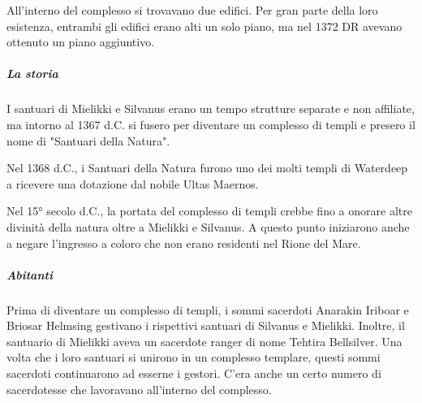 \documentclass{article}
\begin{document}
                All'interno del complesso si trovavano due edifici. Per gran parte della loro esistenza, entrambi gli edifici erano alti un solo piano, ma nel 1372 DR avevano ottenuto un piano aggiuntivo.

                \subparagraph{La storia}
                I santuari di Mielikki e Silvanus erano un tempo strutture separate e non affiliate, ma intorno al 1367 d.C. si fusero per diventare un complesso di templi e presero il nome di "Santuari della Natura".

                Nel 1368 d.C., i Santuari della Natura furono uno dei molti templi di Waterdeep a ricevere una dotazione dal nobile Ultas Maernos.

                Nel 15° secolo d.C., la portata del complesso di templi crebbe fino a onorare altre divinità della natura oltre a Mielikki e Silvanus. A questo punto iniziarono anche a negare l'ingresso a coloro che non erano residenti nel Rione del Mare.

                \subparagraph{Abitanti}
                Prima di diventare un complesso di templi, i sommi sacerdoti Anarakin Iriboar e Briosar Helmsing gestivano i rispettivi santuari di Silvanus e Mielikki. Inoltre, il santuario di Mielikki aveva un sacerdote ranger di nome Tehtira Bellsilver. Una volta che i loro santuari si unirono in un complesso templare, questi sommi sacerdoti continuarono ad esserne i gestori. C'era anche un certo numero di sacerdotesse che lavoravano all'interno del complesso.
\end{document}
